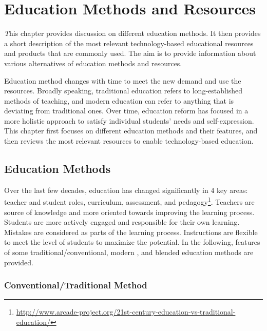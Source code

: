 \chapter{Education Methods and Resources}
\epigraph{\emph This chapter provides discussion on different education methods. It then provides a short description of the most relevant technology-based educational resources and products that are commonly used. The aim is to provide information about various alternatives of education methods and resources.}{}

\newpage 

Education method changes with time to meet the new demand and use the resources. Broadly speaking, traditional education refers to long-established methods of teaching, and modern education can refer to anything that is deviating from traditional ones. Over time, education reform has focused in a more holistic approach to satisfy individual students' needs and self-expression. This chapter first focuses on different education methods and their features, and then reviews the most relevant resources to enable technology-based education.



\section{Education Methods}

Over the last few decades, education has changed significantly in 4 key areas: teacher and student roles, curriculum, assessment, and pedagogy\footnote{\url{http://www.arcade-project.org/21st-century-education-vs-traditional-education/}}. Teachers are source of knowledge and more oriented towards improving the learning process. Students are more actively engaged and responsible for their own learning. Mistakes are considered as parts of the learning process. Instructions are flexible to meet the level of students to maximize the potential. In the following, features of some traditional/conventional, modern , and blended education methods are provided.


\subsection[Conventional/Traditional]{Conventional/Traditional Method}

